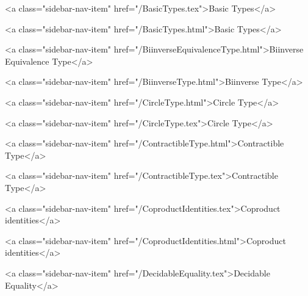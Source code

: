       
        
          <a class="sidebar-nav-item" href="/BasicTypes.tex">Basic Types</a>
        
      
    
      
        
          <a class="sidebar-nav-item" href="/BasicTypes.html">Basic Types</a>
        
      
    
      
        
          <a class="sidebar-nav-item" href="/BiinverseEquivalenceType.html">Biinverse Equivalence Type</a>
        
      
    
      
        
          <a class="sidebar-nav-item" href="/BiinverseType.html">Biinverse Type</a>
        
      
    
      
        
          <a class="sidebar-nav-item" href="/CircleType.html">Circle Type</a>
        
      
    
      
        
          <a class="sidebar-nav-item" href="/CircleType.tex">Circle Type</a>
        
      
    
      
        
          <a class="sidebar-nav-item" href="/ContractibleType.html">Contractible Type</a>
        
      
    
      
        
          <a class="sidebar-nav-item" href="/ContractibleType.tex">Contractible Type</a>
        
      
    
      
        
          <a class="sidebar-nav-item" href="/CoproductIdentities.tex">Coproduct identities</a>
        
      
    
      
        
          <a class="sidebar-nav-item" href="/CoproductIdentities.html">Coproduct identities</a>
        
      
    
      
        
          <a class="sidebar-nav-item" href="/DecidableEquality.tex">Decidable Equality</a>
        
